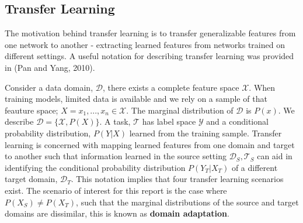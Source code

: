 \subsection{Transfer Learning}
The motivation behind transfer learning is to transfer generalizable features from one network to another - extracting learned features from networks trained on different settings. 
A useful notation for describing transfer learning was provided in (Pan and Yang, 2010)\autocite{PanYang2010}. 

Consider a data domain, $\mathcal{D}$, there exists a complete feature space $\mathcal{X}$. 
When training models, limited data is available and we rely on a sample of that feauture space; $X = x_{1},...,x_{n} \in \mathcal{X}$.
The marginal distribution of $\mathcal{D}$ is $P(x)$. We describe $\mathcal{D} = \{\mathcal{X}, P(X)\}$. 
A task, $\mathcal{T}$ has label space $\mathcal{Y}$ and a conditional probability distribution, $P(Y|X)$ learned from the training sample.
\newline
Transfer learning is concerned with mapping learned features from one domain and target to another such that information learned in the source setting $\mathcal{D}_S, \mathcal{T}_S$ can aid in identifying the conditional probability distribution $P(Y_{T}|X_{T})$ of a different target domain, $\mathcal{D}_T$.
\newline
This notation implies that four transfer learning scenarios exist. 
The scenario of interest for this report is the case where $P(X_{S}) \neq P(X_{T})$, such that the marginal distributions of the source and target domains are dissimilar, this is known as \textbf{domain adaptation}. 



